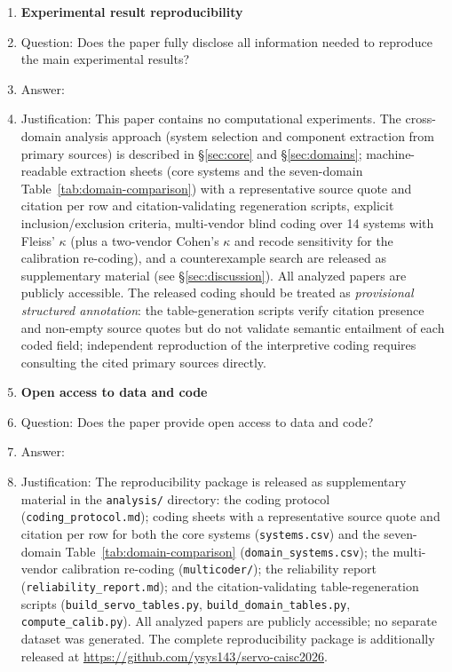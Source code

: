 \documentclass{article}
\begin{document}
\begin{enumerate}
\item {\bf Experimental result reproducibility}
    \item[] Question: Does the paper fully disclose all information needed to reproduce the main experimental results?
    \item[] Answer: \answerYes{}
    \item[] Justification: This paper contains no computational experiments. The cross-domain analysis approach (system selection and component extraction from primary sources) is described in \S\ref{sec:core} and \S\ref{sec:domains}; machine-readable extraction sheets (core systems and the seven-domain Table~\ref{tab:domain-comparison}) with a representative source quote and citation per row and citation-validating regeneration scripts, explicit inclusion/exclusion criteria, multi-vendor blind coding over 14 systems with Fleiss' $\kappa$ (plus a two-vendor Cohen's $\kappa$ and recode sensitivity for the calibration re-coding), and a counterexample search are released as supplementary material (see \S\ref{sec:discussion}). All analyzed papers are publicly accessible. The released coding should be treated as \emph{provisional structured annotation}: the table-generation scripts verify citation presence and non-empty source quotes but do not validate semantic entailment of each coded field; independent reproduction of the interpretive coding requires consulting the cited primary sources directly.

\item {\bf Open access to data and code}
    \item[] Question: Does the paper provide open access to data and code?
    \item[] Answer: \answerYes{}
    \item[] Justification: The reproducibility package is released as supplementary material in the \texttt{analysis/} directory: the coding protocol (\texttt{coding\_protocol.md}); coding sheets with a representative source quote and citation per row for both the core systems (\texttt{systems.csv}) and the seven-domain Table~\ref{tab:domain-comparison} (\texttt{domain\_systems.csv}); the multi-vendor calibration re-coding (\texttt{multicoder/}); the reliability report (\texttt{reliability\_report.md}); and the citation-validating table-regeneration scripts (\texttt{build\_servo\_tables.py}, \texttt{build\_domain\_tables.py}, \texttt{compute\_calib.py}). All analyzed papers are publicly accessible; no separate dataset was generated. The complete reproducibility package is additionally released at \url{https://github.com/ysys143/servo-caisc2026}.


\end{enumerate}
\end{document}
